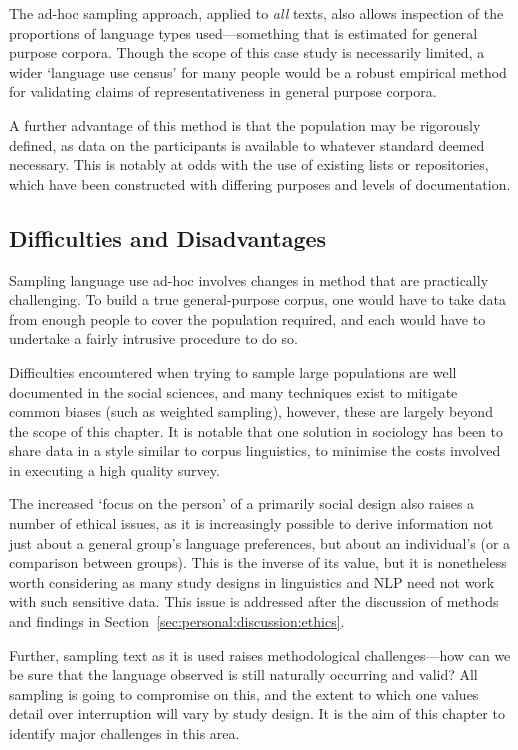 The ad-hoc sampling approach, applied to \textsl{all} texts, also allows inspection of the proportions of language types used---something that is estimated for general purpose corpora.  Though the scope of this case study is necessarily limited, a wider `language use census' for many people would be a robust empirical method for validating claims of representativeness in general purpose corpora.


A further advantage of this method is that the population may be rigorously defined, as data on the participants is available to whatever standard deemed necessary.  This is notably at odds with the use of existing lists or repositories, which have been constructed with differing purposes and levels of documentation.






\subsection{Difficulties and Disadvantages}
Sampling language use ad-hoc involves changes in method that are practically challenging.  To build a true general-purpose corpus, one would have to take data from enough people to cover the population required, and each would have to undertake a fairly intrusive procedure to do so.

Difficulties encountered when trying to sample large populations are well documented in the social sciences, and many techniques exist to mitigate common biases (such as weighted sampling\cite{kalton1983introduction}), however, these are largely beyond the scope of this chapter.  It is notable that one solution in sociology has been to share data in a style similar to corpus linguistics, to minimise the costs involved in executing a high quality survey\cite{dataarchive2015}.

The increased `focus on the person' of a primarily social design also raises a number of ethical issues, as it is increasingly possible to derive information not just about a general group's language preferences, but about an individual's (or a comparison between groups).  This is the inverse of its value, but it is nonetheless worth considering as many study designs in linguistics and NLP need not work with such sensitive data.  This issue is addressed after the discussion of methods and findings in Section~\ref{sec:personal:discussion:ethics}.

Further, sampling text as it is used raises methodological challenges---how can we be sure that the language observed is still naturally occurring and valid?  All sampling is going to compromise on this, and the extent to which one values detail over interruption will vary by study design.  It is the aim of this chapter to identify major challenges in this area.



